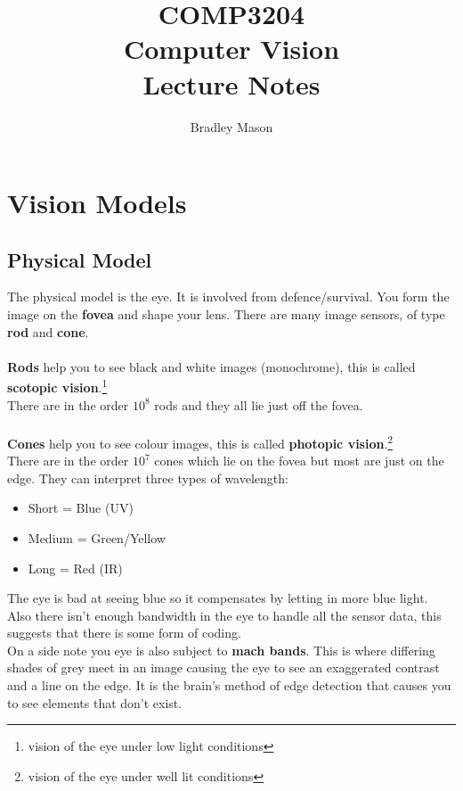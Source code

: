 \documentclass{article}
\begin{document}
	\title{COMP3204\\Computer Vision\\Lecture Notes}
	\author{Bradley Mason}
	\maketitle
	
	\newpage
	\tableofcontents
	\newpage
	
	\section{Vision Models}
	\subsection{Physical Model}
	The physical model is the eye. It is involved from defence/survival. You form the image on the \textbf{fovea} and shape your lens. There are many image sensors, of type \textbf{rod} and \textbf{cone}.\\
	\\\textbf{Rods }help you to see black and white images (monochrome), this is called \textbf{scotopic vision}.\footnote{vision of the eye under low light conditions}\\
	There are in the order $10^8$ rods and they all lie just off the fovea.\\
	\\\textbf{Cones} help you to see colour images, this is called \textbf{photopic vision}.\footnote{vision of the eye under well lit conditions}\\
	There are in the order $10^7$ cones which lie on the fovea but most are just on the edge. They can interpret three types of wavelength:
	\begin{itemize}
		\item Short = Blue (UV)
		\item Medium = Green/Yellow
		\item Long = Red (IR)
	\end{itemize}
	The eye is bad at seeing blue so it compensates by letting in more blue light. Also there isn't enough bandwidth in the eye to handle all the sensor data, this suggests that there is some form of coding.\\
	On a side note you eye is also subject to \textbf{mach bands}. This is where differing shades of grey meet in an image causing the eye to see an exaggerated contrast and a line on the edge. It is the brain's method of edge detection that causes you to see elements that don't exist.
\end{document}
